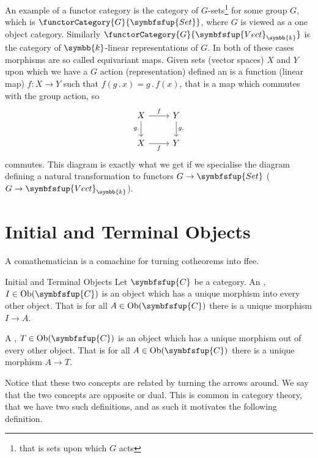 \documentclass[fleqn]{NotesClass}
\makeatletter
\newcommand{\cat}[1]{\symbfsfup{#1}}
\newcommand{\c@egory}[1]{\symbfsfup{#1}}
\newcommand{\Set}{\c@egory{Set}}
\renewcommand{\field}{\symbb{k}}
\newcommand{\Vect}[1][\field]{{\c@egory{Vect}_{#1}}}
\DeclareMathOperator{\Ob}{Ob}
\makeatother
\begin{document}
    An example of a functor category is the category of \(G\)-sets\footnote{that is sets upon which \(G\) acts} for some group \(G\), which is \(\functorCategory{G}{\Set}\), where \(G\) is viewed as a one object category.
    Similarly \(\functorCategory{G}{\Vect}\) is the category of \(\field\)-linear representations of \(G\).
    In both of these cases morphisms are so called equivariant maps.
    Given sets (vector spaces) \(X\) and \(Y\) upon which we have a \(G\) action (representation) defined an  is a function (linear map) \(f \colon X \to Y\) such that \(f(g \mathbin{.} x) = g \mathbin{.} f(x)\), that is a map which commutes with the group action, so
    \begin{equation}
        \begin{tikzcd}
            X \arrow[r, "f"] \arrow[d, "g \mathbin{.} {}"'] & Y \arrow[d, "g \mathbin{.} {}"]\\
            X \arrow[r, "f"'] & Y
        \end{tikzcd}
    \end{equation}
    commutes.
    This diagram is exactly what we get if we specialise the diagram defining a natural transformation to functors \(G \to \Set\) (\(G \to \Vect\)).
    
    \section{Initial and Terminal Objects}
    \epigraph{A comathematician is a comachine for turning cotheorems into ffee.}{}
    \begin{dfn}{Initial and Terminal Objects}{}
        Let \(\cat{C}\) be a category.
        An , \(I \in \Ob(\cat{C})\) is an object which has a unique morphism into every other object.
        That is for all \(A \in \Ob(\cat{C})\) there is a unique morphism \(I \to A\).
        
        A , \(T \in \Ob(\cat{C})\) is an object which has a unique morphism out of every other object.
        That is for all \(A \in \Ob(\cat{C})\) there is a unique morphism \(A \to T\).
    \end{dfn}
    
    Notice that these two concepts are related by turning the arrows around.
    We say that the two concepts are opposite or dual.
    This is common in category theory, that we have two such definitions, and as such it motivates the following definition.
    
\end{document}
